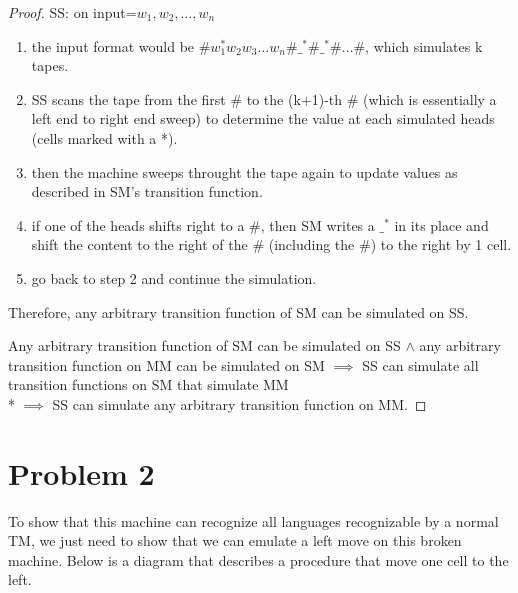 \documentclass{article}
\begin{document}
\begin{proof}
    SS: on input=$ w_1, w_2,\dots, w_n$
    \begin{enumerate}
        \item the input format would be $\#w_1^* w_2 w_3 \dots w_n \# \_^* \# \_^* \# \dots \#$, which simulates k tapes.
        \item SS scans the tape from the first \# to the (k+1)-th \# (which is essentially a left end to right end sweep) to
              determine the value at each simulated heads (cells marked with a *).
        \item then the machine sweeps throught the tape again to update values as described in
              SM's transition function.
        \item if one of the heads shifts right to a \#, then SM writes a $\_^*$ in its place and shift the content to the right
              of the \# (including the \#) to the right by 1 cell.
        \item go back to step 2 and continue the simulation.
    \end{enumerate}

    Therefore, any arbitrary transition function of SM can be simulated on SS.

    Any arbitrary transition function of SM can be simulated on SS $\land$ any arbitrary transition function on MM can be simulated on SM
    $\implies$ SS can simulate all transition functions on SM that simulate MM \\*
    $\implies$ SS can simulate any arbitrary transition function on MM.

\end{proof}
\newpage
\section*{Problem 2}

To show that this machine can recognize all languages recognizable by a normal TM, we just need to show that we can
emulate a left move on this broken machine. Below is a diagram that describes a procedure that
move one cell to the left. 
\end{document}
